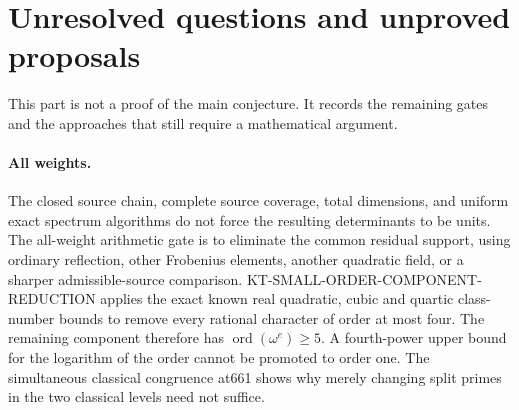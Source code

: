 \section{Unresolved questions and unproved proposals}

This part is not a proof of the main conjecture. It records the
remaining gates and the approaches that still require a
mathematical argument.

\paragraph{All weights.}
The closed source chain, complete source coverage, total
dimensions, and uniform exact spectrum algorithms do not
force the resulting determinants to be units. The all-weight
arithmetic gate is to eliminate the common residual support,
using ordinary reflection, other Frobenius elements, another
quadratic field, or a sharper admissible-source comparison.
KT-SMALL-ORDER-COMPONENT-REDUCTION applies the exact known
real quadratic, cubic and quartic class-number bounds to
remove every rational character of order at most four.
The remaining component therefore has
$\operatorname{ord}(\omega^e)\ge5$.
A fourth-power upper bound for the logarithm of the order
cannot be promoted to order one. The simultaneous classical
congruence at661 shows why merely changing split primes in
the two classical levels need not suffice.

